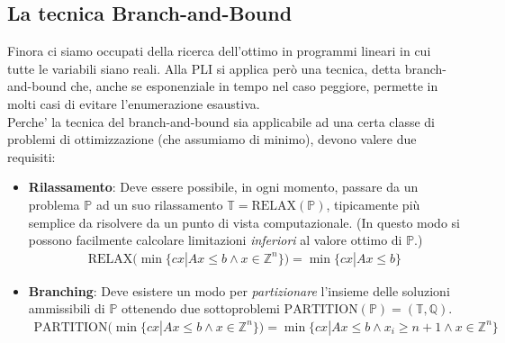 \documentclass[a4paper,12pt]{article}
\begin{document}
\subsection{La tecnica Branch-and-Bound}
Finora ci siamo occupati della ricerca dell’ottimo in programmi lineari in cui tutte le variabili siano reali. Alla PLI si applica però una tecnica, detta branch-and-bound che, anche se esponenziale in tempo nel caso peggiore, permette in molti casi di evitare l’enumerazione esaustiva. \\
Perche' la tecnica del branch-and-bound sia applicabile ad una certa classe di problemi di ottimizzazione (che assumiamo di minimo), devono valere due requisiti:
\begin{itemize}
  \item \textbf{Rilassamento}: Deve essere possibile, in ogni momento, passare da un problema $\mathbb{P}$ ad un suo rilassamento $\mathbb{T} = \text{RELAX}(\mathbb{P})$, tipicamente più semplice da risolvere da un punto di vista computazionale. (In questo modo si possono facilmente calcolare limitazioni \textit{inferiori} al valore ottimo di $\mathbb{P}$.)
  \begin{align*}
    \text{RELAX}(\min \{cx | Ax \leq b \land x \in \mathbb{Z}^n\}) = \min\{cx | Ax \leq b\}
  \end{align*}
  \item \textbf{Branching}: Deve esistere un modo per \textit{partizionare} l’insieme delle soluzioni ammissibili di $\mathbb{P}$ ottenendo due sottoproblemi $\text{PARTITION}(\mathbb{P}) = (\mathbb{T}, \mathbb{Q})$.
  \begin{align*}
    \text{PARTITION}(\min\{cx | Ax \leq b \land x \in \mathbb{Z}^n\}) = \min \{cx | Ax \leq b \land x_i \geq n+1 \land x \in \mathbb{Z}^n\}
  \end{align*}
\end{itemize}
\end{document}
